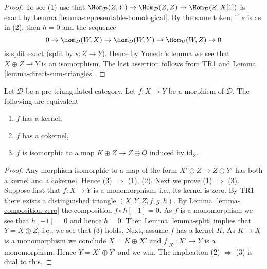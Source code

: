 \begin{proof}
To see (1) use that
$\Hom_\mathcal{D}(Z, Y) \to \Hom_\mathcal{D}(Z, Z) \to
\Hom_\mathcal{D}(Z, X[1])$
is exact by
Lemma \ref{lemma-representable-homological}.
By the same token, if $s$ is as in (2), then $h = 0$ and the sequence
$$
0 \to \Hom_\mathcal{D}(W, X) \to \Hom_\mathcal{D}(W, Y)
\to \Hom_\mathcal{D}(W, Z) \to 0
$$
is split exact (split by $s : Z \to Y$). Hence by Yoneda's lemma we
see that $X \oplus Z \to Y$ is an isomorphism. The last assertion follows
from TR1 and
Lemma \ref{lemma-direct-sum-triangles}.
\end{proof}

\begin{lemma}
\label{lemma-when-split}
Let $\mathcal{D}$ be a pre-triangulated category.
Let $f : X \to Y$ be a morphism of $\mathcal{D}$.
The following are equivalent
\begin{enumerate}
\item $f$ has a kernel,
\item $f$ has a cokernel,
\item $f$ is isomorphic to a map $K \oplus Z \to Z \oplus Q$
induced by $\text{id}_Z$.
\end{enumerate}
\end{lemma}

\begin{proof}
Any morphism isomorphic to a map of the form
$X' \oplus Z \to Z \oplus Y'$ has both a kernel and a cokernel.
Hence (3) $\Rightarrow$ (1), (2).
Next we prove (1) $\Rightarrow$ (3).
Suppose first that $f : X \to Y$ is a monomorphism, i.e., its kernel is zero.
By TR1 there exists a distinguished triangle $(X, Y, Z, f, g, h)$.
By Lemma \ref{lemma-composition-zero} the composition
$f \circ h[-1] = 0$. As $f$ is a monomorphism we see that $h[-1] = 0$
and hence $h = 0$. Then
Lemma \ref{lemma-split}
implies that $Y = X \oplus Z$, i.e., we see that (3) holds.
Next, assume $f$ has a kernel $K$. As $K \to X$ is a monomorphism we
conclude $X = K \oplus X'$ and $f|_{X'} : X' \to Y$ is a monomorphism.
Hence $Y = X' \oplus Y'$ and we win.
The implication (2) $\Rightarrow$ (3) is dual to this.
\end{proof}

